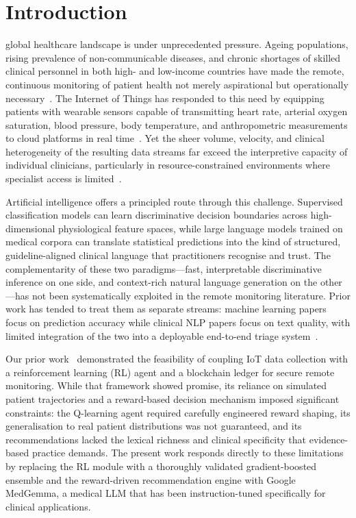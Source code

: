 \documentclass[journal]{IEEEtran}
\begin{document}
\section{Introduction}
\label{sec:intro}

 global healthcare landscape is under unprecedented
pressure. Ageing populations, rising prevalence of non-communicable diseases,
and chronic shortages of skilled clinical personnel in both high- and
low-income countries have made the remote, continuous monitoring of patient
health not merely aspirational but operationally necessary~\cite{yadav2024,
ianculescu2025}. The Internet of Things has responded to this need by
equipping patients with wearable sensors capable of transmitting heart rate,
arterial oxygen saturation, blood pressure, body temperature, and
anthropometric measurements to cloud platforms in real time~\cite{islam2015}.
Yet the sheer volume, velocity, and clinical heterogeneity of the resulting
data streams far exceed the interpretive capacity of individual clinicians,
particularly in resource-constrained environments where specialist access is
limited~\cite{huda2024}.

Artificial intelligence offers a principled route through this challenge.
Supervised classification models can learn discriminative decision boundaries
across high-dimensional physiological feature spaces, while large language
models trained on medical corpora can translate statistical predictions into
the kind of structured, guideline-aligned clinical language that practitioners
recognise and trust. The complementarity of these two paradigms—fast,
interpretable discriminative inference on one side, and context-rich natural
language generation on the other—has not been systematically exploited in the
remote monitoring literature. Prior work has tended to treat them as separate
streams: machine learning papers focus on prediction accuracy while clinical
NLP papers focus on text quality, with limited integration of the two into a
deployable end-to-end triage system~\cite{esteva2021, krishna2023}.

Our prior work~\cite{kunveng_iot} demonstrated the feasibility of coupling IoT
data collection with a reinforcement learning (RL) agent and a blockchain
ledger for secure remote monitoring. While that framework showed promise,
its reliance on simulated patient trajectories and a reward-based decision
mechanism imposed significant constraints: the Q-learning agent required
carefully engineered reward shaping, its generalisation to real patient
distributions was not guaranteed, and its recommendations lacked the
lexical richness and clinical specificity that evidence-based practice
demands. The present work responds directly to these limitations by replacing
the RL module with a thoroughly validated gradient-boosted ensemble and the
reward-driven recommendation engine with Google MedGemma, a medical LLM that
has been instruction-tuned specifically for clinical applications.
\end{document}
